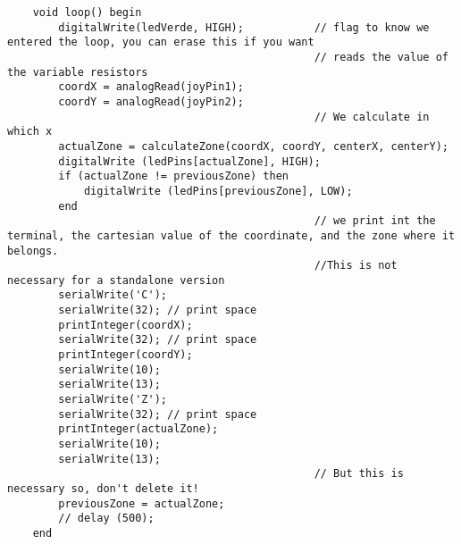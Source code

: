 \begin{lstlisting}
    void loop() begin
        digitalWrite(ledVerde, HIGH);           // flag to know we entered the loop, you can erase this if you want
                                                // reads the value of the variable resistors 
        coordX = analogRead(joyPin1);   
        coordY = analogRead(joyPin2);   
                                                // We calculate in which x
        actualZone = calculateZone(coordX, coordY, centerX, centerY); 
        digitalWrite (ledPins[actualZone], HIGH);     
        if (actualZone != previousZone) then
            digitalWrite (ledPins[previousZone], LOW);
        end
                                                // we print int the terminal, the cartesian value of the coordinate, and the zone where it belongs. 
                                                //This is not necessary for a standalone version
        serialWrite('C');
        serialWrite(32); // print space
        printInteger(coordX);
        serialWrite(32); // print space
        printInteger(coordY);
        serialWrite(10);
        serialWrite(13);
        serialWrite('Z');
        serialWrite(32); // print space
        printInteger(actualZone);
        serialWrite(10);
        serialWrite(13);
                                                // But this is necessary so, don't delete it!
        previousZone = actualZone;
        // delay (500);
    end
\end{lstlisting}